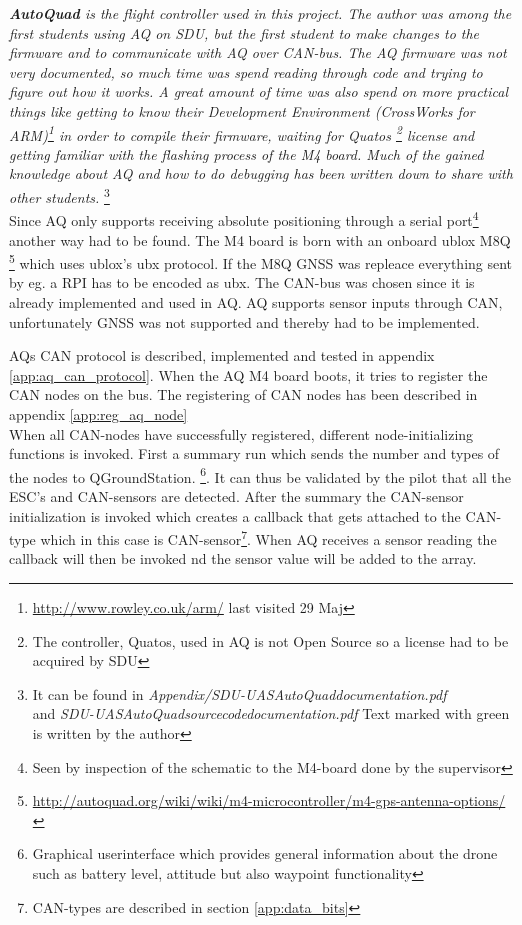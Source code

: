 \textit{\textbf{AutoQuad} is the flight controller used in this project.
The author was among the first students using \ac{AQ} on \ac{SDU}, but the first student to make changes to the firmware and to communicate with \ac{AQ} over \ac{CAN}-bus.
The \ac{AQ} firmware was not very documented, so much time was spend reading through code and trying to figure out how it works.
A great amount of time was also spend on more practical things like getting to know their Development Environment (CrossWorks for ARM)\footnote{\url{http://www.rowley.co.uk/arm/} last visited 29 Maj} in order to compile their firmware, waiting for Quatos \footnote{The controller, Quatos, used in AQ is not Open Source so a license had to be acquired by SDU} license and getting familiar with the flashing process of the M4 board.
Much of the gained knowledge about \ac{AQ} and how to do debugging has been written down to share with other students.}
\footnote{It can be found in \textit{Appendix/SDU-UASAutoQuaddocumentation.pdf} \\ and \textit{SDU-UASAutoQuadsourcecodedocumentation.pdf} Text marked with green is written by the author} \\


Since \ac{AQ} only supports receiving absolute positioning through a serial port\footnote{Seen by inspection of the schematic to the M4-board done by the supervisor} another way had to be found.
The M4 board is born with an onboard ublox M8Q \footnote{\url{http://autoquad.org/wiki/wiki/m4-microcontroller/m4-gps-antenna-options/}} which uses ublox's ubx protocol. If the M8Q GNSS was repleace everything sent by eg. a RPI has to be encoded as ubx.
The CAN-bus was chosen since it is already implemented and used in \ac{AQ}. \ac{AQ} supports sensor inputs through CAN, unfortunately GNSS was not supported and thereby had to be implemented.

\ac{AQ}s CAN protocol is described, implemented and tested in appendix \ref{app:aq_can_protocol}.
When the AQ M4 board boots, it tries to register the CAN nodes on the bus. The registering of CAN nodes has been described in appendix \ref{app:reg_aq_node}\\

When all CAN-nodes have successfully registered, different node-initializing functions is invoked.
First a summary run which sends the number and types of the nodes to QGroundStation. \footnote{Graphical userinterface which provides general information about the drone such as battery level, attitude but also waypoint functionality}.
It can thus be validated by the pilot that all the ESC's and CAN-sensors are detected.
After the summary the CAN-sensor initialization is invoked which creates a callback that gets attached to the CAN-type which in this case is CAN-sensor\footnote{CAN-types are described in section \ref{app:data_bits}}. When \ac{AQ} receives a sensor reading the callback will then be invoked nd the sensor value will be added to the array.\\

